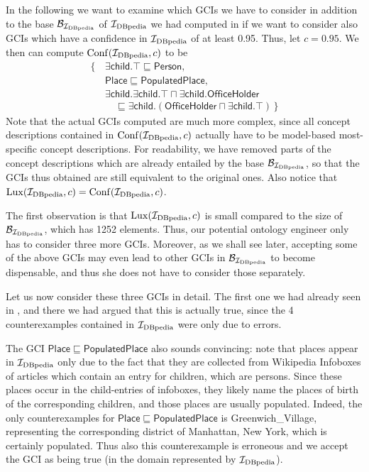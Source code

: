 In the following we want to examine which GCIs we have to consider in addition to the base
$\mathcal{B}_{{\mathcal{I}_{\text{DBpedia}}}}$ of ${\mathcal{I}_{\text{DBpedia}}}$ we had computed in
 if we want to consider also GCIs which have a confidence
in ${\mathcal{I}_{\text{DBpedia}}}$ of at least 0.95.  Thus, let $c = 0.95$.  We then can compute
$\operatorname{Conf}({\mathcal{I}_{\text{DBpedia}}}, c)$ to be
\begin{align*}
  \{\,
  & \mathsf{\exists child. \top} \sqsubseteq \mathsf{Person}, \\
  & \mathsf{Place} \sqsubseteq \mathsf{PopulatedPlace},\\
  & \mathsf{\exists child. \exists child. \top} \sqcap \mathsf{\exists
    child. OfficeHolder} \\
  & \quad \sqsubseteq \mathsf{\exists child. (OfficeHolder \sqcap \exists child. \top)}
  \,\}
\end{align*}
Note that the actual GCIs computed are much more complex, since all concept descriptions
contained in $\operatorname{Conf}({\mathcal{I}_{\text{DBpedia}}}, c)$ actually have to be model-based most-specific concept
descriptions.  For readability, we have removed parts of the concept descriptions which
are already entailed by the base $\mathcal{B}_{\mathcal{I}_{\text{DBpedia}}}$, so that the GCIs thus obtained
are still equivalent to the original ones.  Also notice that $\operatorname{Lux}({\mathcal{I}_{\text{DBpedia}}}, c) =
\operatorname{Conf}({\mathcal{I}_{\text{DBpedia}}}, c)$.

The first observation is that $\operatorname{Lux}({\mathcal{I}_{\text{DBpedia}}}, c)$ is small compared to the size of
$\mathcal{B}_{\mathcal{I}_{\text{DBpedia}}}$, which has 1252 elements.  Thus, our potential ontology engineer
only has to consider three more GCIs.  Moreover, as we shall see later, accepting some of
the above GCIs may even lead to other GCIs in $\mathcal{B}_{\mathcal{I}_{\text{DBpedia}}}$ to become
dispensable, and thus she does not have to consider those separately.

Let us now consider these three GCIs in detail.  The first one we had already seen in
, and there we had argued that this is actually true, since
the 4 counterexamples contained in ${\mathcal{I}_{\text{DBpedia}}}$ were only due to errors.

The GCI $\mathsf{Place} \sqsubseteq \mathsf{PopulatedPlace}$ also sounds convincing: note
that places appear in ${\mathcal{I}_{\text{DBpedia}}}$ only due to the fact that they are collected from
Wikipedia Infoboxes of articles which contain an entry for children, \ie which are
persons.  Since these places occur in the child-entries of infoboxes, they likely name the
places of birth of the corresponding children, and those places are usually populated.
Indeed, the only counterexamples for $\mathsf{Place \sqsubseteq PopulatedPlace}$ is
\textsf{Greenwich\_Village}, representing the corresponding district of Manhattan, New
York, which is certainly populated.  Thus also this counterexample is erroneous and we
accept the GCI as being true (in the domain represented by ${\mathcal{I}_{\text{DBpedia}}}$).

